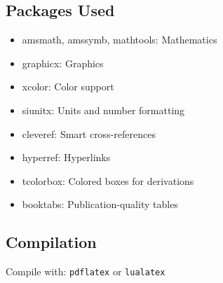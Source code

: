 \documentclass[a4paper,11pt]{article}
\begin{document}
\subsection*{Packages Used}
\begin{itemize}
    \item amsmath, amssymb, mathtools: Mathematics
    \item graphicx: Graphics
    \item xcolor: Color support
    \item siunitx: Units and number formatting
    \item cleveref: Smart cross-references
    \item hyperref: Hyperlinks
    \item tcolorbox: Colored boxes for derivations
    \item booktabs: Publication-quality tables
\end{itemize}

\subsection*{Compilation}
Compile with: \texttt{pdflatex} or \texttt{lualatex}

\clearpage
\end{document}
